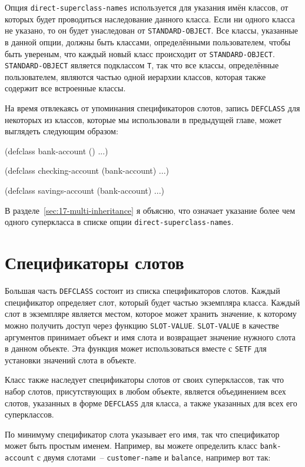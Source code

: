 Опция \lstinline{direct-superclass-names} используется для указания имён классов, от которых
будет проводиться наследование данного класса.  Если ни одного класса не указано, то он
будет унаследован от \lstinline{STANDARD-OBJECT}.  Все классы, указанные в данной опции, должны
быть классами, определёнными пользователем, чтобы быть увереным, что каждый новый класс
происходит от \lstinline{STANDARD-OBJECT}.  \lstinline{STANDARD-OBJECT} является подклассом
\lstinline{T}, так что все классы, определённые пользователем, являются частью одной иерархии
классов, которая также содержит все встроенные классы.

На время отвлекаясь от упоминания спецификаторов слотов, запись \lstinline{DEFCLASS} для
некоторых из классов, которые мы использовали в предыдущей главе, может выглядеть
следующим образом:

\begin{myverb}
(defclass bank-account () ...)

(defclass checking-account (bank-account) ...)

(defclass savings-account (bank-account) ...)
\end{myverb}

В разделе~\ref{sec:17-multi-inheritance} я объясню, что означает указание более чем одного
суперкласса в списке опции \lstinline{direct-superclass-names}.

\section{Спецификаторы слотов}

Большая часть \lstinline{DEFCLASS} состоит из списка спецификаторов слотов.  Каждый
спецификатор определяет слот, который будет частью экземпляра класса.  Каждый слот в
экземпляре является местом, которое может хранить значение, к которому можно получить
доступ через функцию \lstinline{SLOT-VALUE}. \lstinline{SLOT-VALUE} в качестве аргументов принимает
объект и имя слота и возвращает значение нужного слота в данном объекте.  Эта функция
может использоваться вместе с \lstinline{SETF} для установки значений слота в объекте.

Класс также наследует спецификаторы слотов от своих суперклассов, так что набор слотов,
присутствующих в любом объекте, является объединением всех слотов, указанных в форме
\lstinline{DEFCLASS} для класса, а также указанных для всех его суперклассов.

По минимуму спецификатор слота указывает его имя, так что спецификатор может быть простым
именем.  Например, вы можете определить класс \lstinline{bank-account} с двумя слотами~--
\lstinline{customer-name} и \lstinline{balance}, например вот так:

